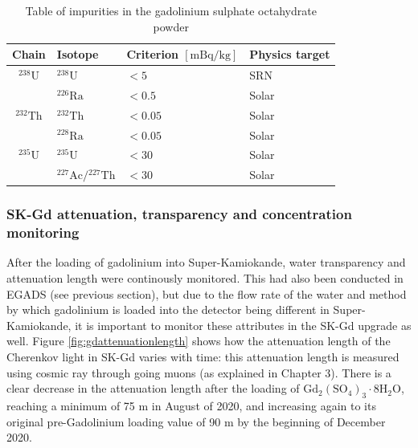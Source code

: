 \begin{table}
\centering
\begin{tabular}{clll}
    \hline \hline Chain & Isotope & Criterion $[\mathrm{mBq} / \mathrm{kg}]$ & Physics target \\
    \hline${ }^{238} \mathrm{U}$ & ${ }^{238} \mathrm{U}$ & $<5$ & SRN \\
    & ${ }^{226} \mathrm{Ra}$ & $<0.5$ & Solar \\
    \hline${ }^{232} \mathrm{Th}$ & ${ }^{232} \mathrm{Th}$ & $<0.05$ & Solar \\
    & ${ }^{228} \mathrm{Ra}$ & $<0.05$ & Solar \\
    \hline${ }^{235} \mathrm{U}$ & ${ }^{235} \mathrm{U}$ & $<30$ & Solar \\
    & ${ }^{227} \mathrm{Ac} /{ }^{227} \mathrm{Th}$ & $<30$ & Solar \\
    \hline \hline
    \end{tabular}
\caption{Table of impurities in the gadolinium sulphate octahydrate powder}
\label{table:gdpowderradiation}
\end{table}

\subsubsection{SK-Gd attenuation, transparency and concentration monitoring}

After the loading of gadolinium into Super-Kamiokande, water transparency and attenuation length were continously monitored. This had also been conducted in EGADS (see previous section), but due to the flow rate of the water and method by which gadolinium is loaded into the detector being different in Super-Kamiokande, it is important to monitor these attributes in the SK-Gd upgrade as well. Figure \ref{fig:gdattenuationlength} shows how the attenuation length of the Cherenkov light in SK-Gd varies with time: this attenuation length is measured using cosmic ray through going muons (as explained in Chapter 3). There is a clear decrease in the attenuation length after the loading of $\mathrm{Gd}_{2}\left(\mathrm{SO}_{4}\right)_{3} \cdot 8 \mathrm{H}_{2} \mathrm{O}$, reaching a minimum of 75 m in August of 2020, and increasing again to its original pre-Gadolinium loading value of 90 m by the beginning of December 2020.  

